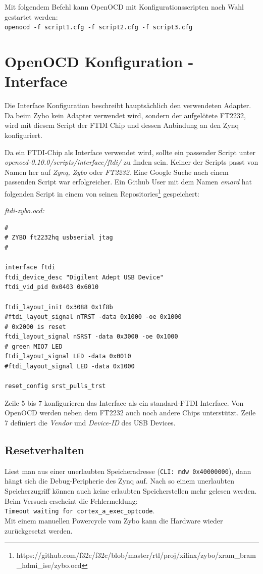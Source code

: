 Mit folgendem Befehl kann OpenOCD mit Konfigurationsscripten nach Wahl gestartet werden:\\
\texttt{openocd -f script1.cfg -f script2.cfg -f script3.cfg}


\section{OpenOCD Konfiguration - Interface}
Die Interface Konfiguration beschreibt hauptsächlich den verwendeten Adapter.
Da beim Zybo kein Adapter verwendet wird, sondern der aufgelötete FT2232, wird mit diesem Script der FTDI Chip und dessen Anbindung an den Zynq konfiguriert.

Da ein FTDI-Chip als Interface verwendet wird, sollte ein passender Script unter \textit{openocd-0.10.0/scripts/interface/ftdi/} zu finden sein.
Keiner der Scripts passt von Namen her auf \textit{Zynq, Zybo} oder \textit{FT2232}.
Eine Google Suche nach einem passenden Script war erfolgreicher.
Ein Github User mit dem Namen \textit{emard} hat folgenden Script in einem von seinen Repositories\footnote{https://github.com/f32c/f32c/blob/master/rtl/proj/xilinx/zybo/xram\_bram\_hdmi\_ise/zybo.ocd} gespeichert:

\textit{ftdi-zybo.ocd:}
\begin{lstlisting}
#
# ZYBO ft2232hq usbserial jtag
#

interface ftdi
ftdi_device_desc "Digilent Adept USB Device"
ftdi_vid_pid 0x0403 0x6010

ftdi_layout_init 0x3088 0x1f8b
#ftdi_layout_signal nTRST -data 0x1000 -oe 0x1000
# 0x2000 is reset
ftdi_layout_signal nSRST -data 0x3000 -oe 0x1000
# green MIO7 LED
ftdi_layout_signal LED -data 0x0010
#ftdi_layout_signal LED -data 0x1000

reset_config srst_pulls_trst

\end{lstlisting}

Zeile 5 bis 7 konfigurieren das Interface als ein standard-FTDI Interface.
Von OpenOCD werden neben dem FT2232 auch noch andere Chips unterstützt.
Zeile 7 definiert die \textit{Vendor} und \textit{Device-ID} des USB Devices.

\subsection{Resetverhalten}
Liest man aus einer unerlaubten Speicheradresse (\texttt{CLI: mdw 0x40000000}), dann hängt sich die Debug-Peripherie des Zynq auf.
Nach so einem unerlaubten Speicherzugriff können auch keine erlaubten Speicherstellen mehr gelesen werden.
Beim Versuch erscheint die Fehlermeldung:\\
 \texttt{Timeout waiting for cortex\_a\_exec\_optcode}.\\
Mit einem manuellen Powercycle vom Zybo kann die Hardware wieder zurückgesetzt werden.

